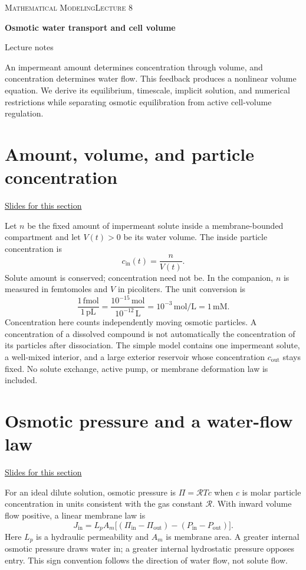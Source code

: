 \documentclass[11pt,letterpaper]{article}
\theoremstyle{definition}\newtheorem{definition}{Definition}\newtheorem{example}{Example}
\numberwithin{equation}{section}
\begin{document}
{\small\scshape Mathematical Modeling\hfill Lecture 8}\par\medskip
{\raggedright{}\LARGE\bfseries\color{ink} Osmotic water transport and cell volume\par}\medskip
{\small Lecture notes}\par\bigskip
An impermeant amount determines concentration through volume, and concentration determines water flow. This feedback produces a nonlinear volume equation. We derive its equilibrium, timescale, implicit solution, and numerical restrictions while separating osmotic equilibration from active cell-volume regulation.

\section{Amount, volume, and particle concentration}
\hypertarget{note-amount-volume-and-particle-concentration}{}\label{note:amount-volume-and-particle-concentration}
{\small \href{slides.html\#frame=an-impermeant-amount-in-a-changing-volume\&step=1}{Slides for this section}}\par
Let $n$ be the fixed amount of impermeant solute inside a membrane-bounded compartment and let $V(t)>0$ be its water volume. The inside particle concentration is
\[
c_{\mathrm{in}}(t)=\frac n{V(t)}.
\]
Solute amount is conserved; concentration need not be. In the companion, $n$ is measured in femtomoles and $V$ in picoliters. The unit conversion is
\[
\frac{1\,\mathrm{fmol}}{1\,\mathrm{pL}}
=\frac{10^{-15}\,\mathrm{mol}}{10^{-12}\,\mathrm L}
=10^{-3}\,\mathrm{mol/L}=1\,\mathrm{mM}.
\]
Concentration here counts independently moving osmotic particles. A concentration of a dissolved compound is not automatically the concentration of its particles after dissociation. The simple model contains one impermeant solute, a well-mixed interior, and a large exterior reservoir whose concentration $c_{\mathrm{out}}$ stays fixed. No solute exchange, active pump, or membrane deformation law is included.
\section{Osmotic pressure and a water-flow law}
\hypertarget{note-osmotic-pressure-and-a-water-flow-law}{}\label{note:osmotic-pressure-and-a-water-flow-law}
{\small \href{slides.html\#frame=osmotic-and-hydrostatic-driving-pressures\&step=1}{Slides for this section}}\par
For an ideal dilute solution, osmotic pressure is $\Pi=\mathcal R T c$ when $c$ is molar particle concentration in units consistent with the gas constant $\mathcal R$. With inward volume flow positive, a linear membrane law is
\[
J_{\mathrm{in}}=L_p A_m\bigl[(\Pi_{\mathrm{in}}-\Pi_{\mathrm{out}})-(P_{\mathrm{in}}-P_{\mathrm{out}})\bigr].
\]
Here $L_p$ is a hydraulic permeability and $A_m$ is membrane area. A greater internal osmotic pressure draws water in; a greater internal hydrostatic pressure opposes entry. This sign convention follows the direction of water flow, not solute flow.
\end{document}
